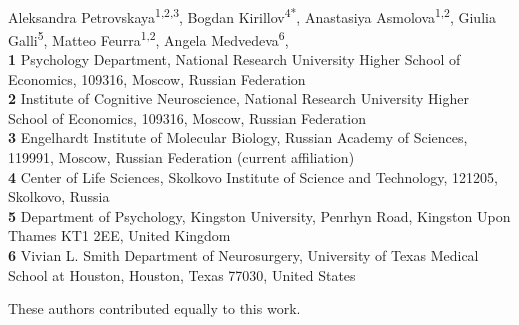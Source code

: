 \documentclass[10pt,letterpaper]{article}
\begin{document}
\vspace*{0.2in}

\begin{flushleft}
{\Large
\textbf{} %
}


\newline
\\
Aleksandra Petrovskaya\textsuperscript{1,2,3\Yinyang},
Bogdan Kirillov\textsuperscript{4*\Yinyang},
Anastasiya Asmolova\textsuperscript{1,2},
Giulia Galli\textsuperscript{5},
Matteo Feurra\textsuperscript{1,2\ddag},
Angela Medvedeva\textsuperscript{6\ddag},
\\
\bigskip
\textbf{1} Psychology Department, National Research University Higher School of Economics, 109316, Moscow, Russian Federation
\\
\textbf{2} Institute of Cognitive Neuroscience, National Research University Higher School of Economics, 109316, Moscow, Russian Federation
\\
\textbf{3} Engelhardt Institute of Molecular Biology, Russian Academy of Sciences, 119991, Moscow, Russian Federation (current affiliation)
\\
\textbf{4} Center of Life Sciences, Skolkovo Institute of Science and Technology, 121205, Skolkovo, Russia
\\
\textbf{5} Department of Psychology, Kingston University, Penrhyn Road, Kingston Upon Thames KT1 2EE, United Kingdom 
\\
\textbf{6} Vivian L. Smith Department of Neurosurgery, University of Texas Medical School at Houston, Houston, Texas 77030, United States
\\
\bigskip


% 
%
\Yinyang These authors contributed equally to this work.


\end{flushleft}
\end{document}
